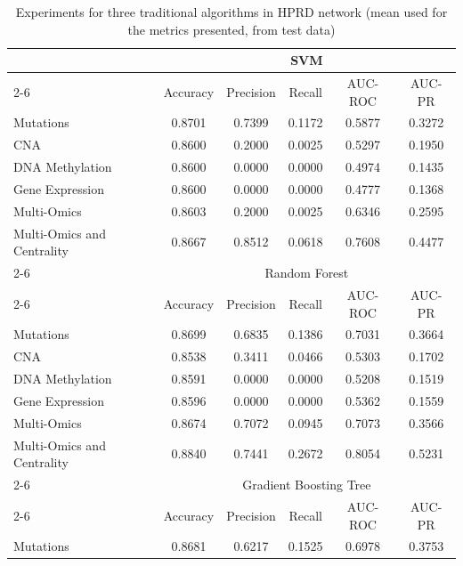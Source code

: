 \documentclass[ppgc, diss, english]{iiufrgs}
\begin{document}
\begin{table}[!th]
\caption{Experiments for three traditional algorithms in HPRD network (mean used for the metrics presented, from test data) \label{tab:completa_trad_hprd}}
\centering
\begin{tabular}{lccccc}
\hline
                           & \multicolumn{5}{c}{SVM}                          \\ \cline{2-6} 
                           & Accuracy & Precision & Recall & AUC-ROC & AUC-PR \\
Mutations                  & 0.8701   & 0.7399    & 0.1172 & 0.5877  & 0.3272 \\
CNA                        & 0.8600   & 0.2000    & 0.0025 & 0.5297  & 0.1950 \\
DNA Methylation            & 0.8600   & 0.0000    & 0.0000 & 0.4974  & 0.1435 \\
Gene Expression            & 0.8600   & 0.0000    & 0.0000 & 0.4777  & 0.1368 \\
Multi-Omics                & 0.8603   & 0.2000    & 0.0025 & 0.6346  & 0.2595 \\
Multi-Omics and Centrality & 0.8667   & 0.8512    & 0.0618 & 0.7608  & 0.4477 \\ \cline{2-6} 
                           & \multicolumn{5}{c}{Random Forest}                \\ \cline{2-6} 
                           & Accuracy & Precision & Recall & AUC-ROC & AUC-PR \\
Mutations                  & 0.8699   & 0.6835    & 0.1386 & 0.7031  & 0.3664 \\
CNA                        & 0.8538   & 0.3411    & 0.0466 & 0.5303  & 0.1702 \\
DNA Methylation            & 0.8591   & 0.0000    & 0.0000 & 0.5208  & 0.1519 \\
Gene Expression            & 0.8596   & 0.0000    & 0.0000 & 0.5362  & 0.1559 \\
Multi-Omics                & 0.8674   & 0.7072    & 0.0945 & 0.7073  & 0.3566 \\
Multi-Omics and Centrality & 0.8840   & 0.7441    & 0.2672 & 0.8054  & 0.5231 \\ \cline{2-6} 
                           & \multicolumn{5}{c}{Gradient Boosting Tree}            \\ \cline{2-6} 
                           & Accuracy & Precision & Recall & AUC-ROC & AUC-PR \\
Mutations                  & 0.8681   & 0.6217    & 0.1525 & 0.6978  & 0.3753 \\

\end{tabular}
\end{table}
\end{document}
